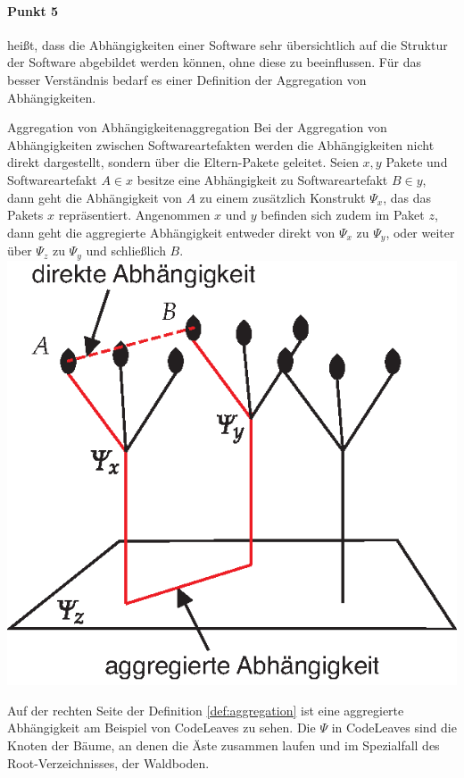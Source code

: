 \paragraph{Punkt 5} heißt, dass die Abhängigkeiten einer Software sehr übersichtlich auf die Struktur der Software abgebildet werden können, ohne diese zu beeinflussen. Für das besser Verständnis bedarf es einer Definition der Aggregation von Abhängigkeiten.

\begin{splitbox}{Aggregation von Abhängigkeiten}{aggregation}
Bei der Aggregation von Abhängigkeiten zwischen Softwareartefakten werden die Abhängigkeiten nicht direkt dargestellt, sondern über die Eltern-Pakete geleitet. Seien $x, y$ Pakete und Softwareartefakt $A \in x$ besitze eine Abhängigkeit zu Softwareartefakt $B \in y$, dann geht die Abhängigkeit von $A$ zu einem zusätzlich Konstrukt $\Psi_x$, das das Pakets $x$ repräsentiert. Angenommen $x$ und $y$ befinden sich zudem im Paket $z$, dann geht die aggregierte Abhängigkeit entweder direkt von $\Psi_x$ zu $\Psi_y$, oder weiter über $\Psi_z$ zu $\Psi_y$ und schließlich $B$.
\tcblower
\includegraphics[width=\linewidth]{figures/aggregation}
\end{splitbox}

Auf der rechten Seite der Definition \ref{def:aggregation} ist eine aggregierte Abhängigkeit am Beispiel von CodeLeaves zu sehen. Die $\Psi$ in CodeLeaves sind die Knoten der Bäume, an denen die Äste zusammen laufen und im Spezialfall des Root-Verzeichnisses, der Waldboden.

